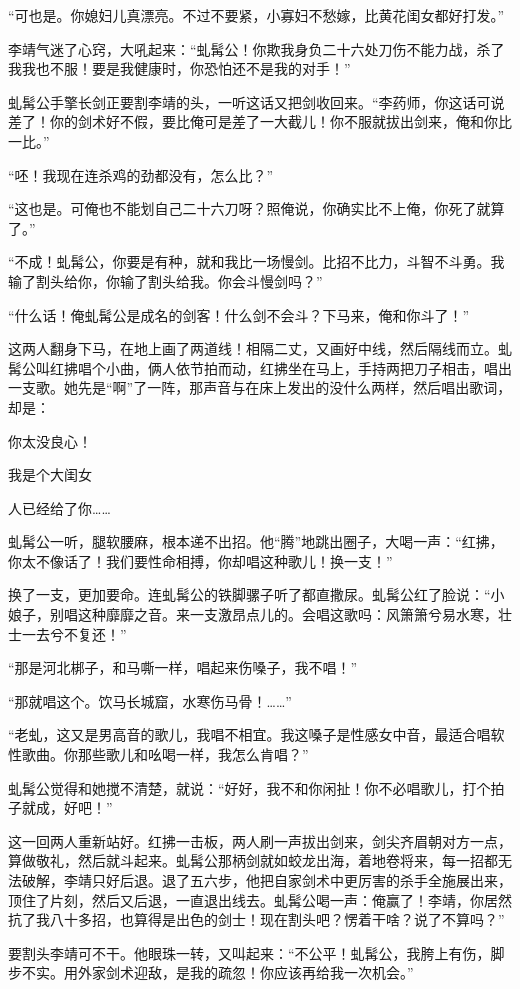“可也是。你媳妇儿真漂亮。不过不要紧，小寡妇不愁嫁，比黄花闺女都好打发。”

李靖气迷了心窍，大吼起来：“虬髯公！你欺我身负二十六处刀伤不能力战，杀了我我也不服！要是我健康时，你恐怕还不是我的对手！”

虬髯公手擎长剑正要割李靖的头，一听这话又把剑收回来。“李药师，你这话可说差了！你的剑术好不假，要比俺可是差了一大截儿！你不服就拔出剑来，俺和你比一比。”

“呸！我现在连杀鸡的劲都没有，怎么比？”

“这也是。可俺也不能划自己二十六刀呀？照俺说，你确实比不上俺，你死了就算了。”

“不成！虬髯公，你要是有种，就和我比一场慢剑。比招不比力，斗智不斗勇。我输了割头给你，你输了割头给我。你会斗慢剑吗？”

“什么话！俺虬髯公是成名的剑客！什么剑不会斗？下马来，俺和你斗了！”

这两人翻身下马，在地上画了两道线！相隔二丈，又画好中线，然后隔线而立。虬髯公叫红拂唱个小曲，俩人依节拍而动，红拂坐在马上，手持两把刀子相击，唱出一支歌。她先是“啊”了一阵，那声音与在床上发出的没什么两样，然后唱出歌词，却是：

你太没良心！

我是个大闺女

人已经给了你……

虬髯公一听，腿软腰麻，根本递不出招。他“腾”地跳出圈子，大喝一声：“红拂，你太不像话了！我们要性命相搏，你却唱这种歌儿！换一支！”

换了一支，更加要命。连虬髯公的铁脚骡子听了都直撒尿。虬髯公红了脸说：“小娘子，别唱这种靡靡之音。来一支激昂点儿的。会唱这歌吗：风箫箫兮易水寒，壮士一去兮不复还！”

“那是河北梆子，和马嘶一样，唱起来伤嗓子，我不唱！”

“那就唱这个。饮马长城窟，水寒伤马骨！……”

“老虬，这又是男高音的歌儿，我唱不相宜。我这嗓子是性感女中音，最适合唱软性歌曲。你那些歌儿和吆喝一样，我怎么肯唱？”

虬髯公觉得和她搅不清楚，就说：“好好，我不和你闲扯！你不必唱歌儿，打个拍子就成，好吧！”

这一回两人重新站好。红拂一击板，两人刷一声拔出剑来，剑尖齐眉朝对方一点，算做敬礼，然后就斗起来。虬髯公那柄剑就如蛟龙出海，着地卷将来，每一招都无法破解，李靖只好后退。退了五六步，他把自家剑术中更厉害的杀手全施展出来，顶住了片刻，然后又后退，一直退出线去。虬髯公喝一声：俺赢了！李靖，你居然抗了我八十多招，也算得是出色的剑士！现在割头吧？愣着干啥？说了不算吗？”

要割头李靖可不干。他眼珠一转，又叫起来：“不公平！虬髯公，我胯上有伤，脚步不实。用外家剑术迎敌，是我的疏忽！你应该再给我一次机会。”

